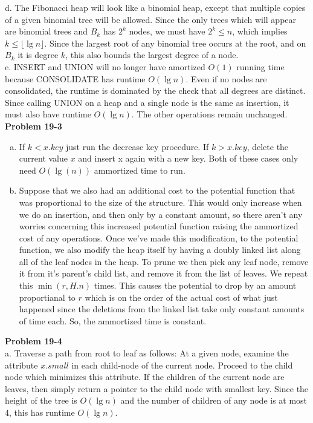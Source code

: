 \documentclass{article}
\begin{document}
d. The Fibonacci heap will look like a binomial heap, except that multiple copies of a given binomial tree will be allowed. Since the only trees which will appear are binomial trees and $B_k$ has $2^k$ nodes, we must have $2^k \leq n$, which implies $k \leq \lfloor \lg n \rfloor$.  Since the largest root of any binomial tree occurs at the root, and on $B_k$ it is degree $k$, this also bounds the largest degree of a node. \\

e. INSERT and UNION will no longer have amortized $O(1)$ running time because CONSOLIDATE has runtime $O(\lg n)$.  Even if no nodes are consolidated, the runtime is dominated by the check that all degrees are distinct.  Since calling UNION on a heap and a single node is the same as insertion, it must also have runtime $O(\lg n)$.  The other operations remain unchanged. \\

\noindent\textbf{Problem 19-3}\\
\begin{enumerate}[a.]
\item
If $k<x.key$ just run the decrease key procedure. If $k>x.key$, delete the current value $x$ and insert x again with a new key. Both of these cases only need $O(\lg(n))$ ammortized time to run.
\item
Suppose that we also had an additional cost to the potential function that was proportional to the size of the structure. This would only increase when we do an insertion, and then only by a constant amount, so there aren't any worries concerning this increased potential function raising the ammortized cost of any operations. Once we've made this modification, to the potential function, we also modify the heap itself by having a doubly linked list along all of the leaf nodes in the heap. To prune we then pick any leaf node, remove it from it's parent's child list, and remove it from the list of leaves. We repeat this $\min(r,H.n)$ times. This causes the potential to drop by an amount proportianal to $r$ which is on the order of the actual cost of what just happened since the deletions from the linked list take only constant amounts of time each. So, the ammortized time is constant.\\

\end{enumerate}

\noindent\textbf{Problem 19-4}\\

a. Traverse a path from root to leaf as follows: At a given node, examine the attribute $x.small$ in each child-node of the current node. Proceed to the child node which minimizes this attribute. If the children of the current node are leaves, then simply return a pointer to the child node with smallest key.  Since the height of the tree is $O(\lg n)$ and the number of children of any node is at most 4, this has runtime $O(\lg n)$. \\
\end{document}
